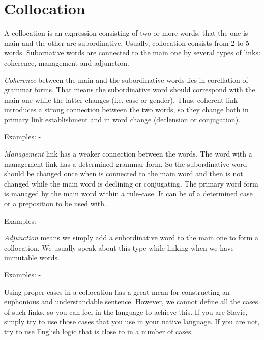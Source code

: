 \section{Collocation}

A collocation is an expression consisting of two or more words, that the one is main and the other are subordinative. Usually, collocation consists from 2 to 5 words. Subornative words are connected to the main one by several types of links: coherence, management and adjunction.

\textit{Coherence} between the main and the subordinative words lies in corellation of grammar forms. That means the subordinative word should correspond with the main one while the latter changes (i.e. case or gender). Thus, coherent link introduces a strong connection between the two words, so they change both in primary link establishment and in word change (declension or conjugation).

Examples:
- 

\textit{Management} link has a weaker connection between the words. The word with a management link has a determined grammar form. So the subordinative word should be changed once when is connected to the main word and then is not changed while the main word is declining or conjugating. The primary word form is managed by the main word within a rule-case. It can be of a determined case or a preposition to be used with.

Examples:
- 

\textit{Adjunction} means we simply add a subordinative word to the main one to form a collocation. We usually speak about this type while linking when we have immutable words.

Examples:
- 

Using proper cases in a collocation has a great mean for constructing an euphonious and understandable sentence. However, we cannot define all the cases of such links, so you can feel-in the language to achieve this. If you are Slavic, simply try to use those cases that you use in your native language. If you are not, try to use English logic that is close to in a number of cases.